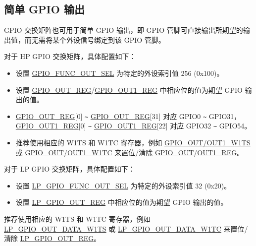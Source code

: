 \documentclass[main\_\_CN.tex]{subfiles}
\begin{document}
\subsection{简单 GPIO 输出}

GPIO 交换矩阵也可用于简单 GPIO 输出，即 GPIO 管脚可直接输出所期望的输出值，而无需将某个外设信号绑定到该 GPIO 管脚。

对于 HP GPIO 交换矩阵，具体配置如下：

\begin{itemize}
    \item 设置 \hyperref[fielddesc:GPIOFUNCNOUTSEL]{GPIO\_FUNC\_OUT\_SEL} 为特定的外设索引值 256 (0x100)。
    \item 设置 \hyperref[regdesc:GPIOOUTREG]{GPIO\_OUT\_REG}/\hyperref[regdesc:GPIOOUT1REG]{GPIO\_OUT1\_REG} 中相应位的值为期望 GPIO 输出的值。
\end{itemize}
\begin{tiplisting}
\vspace{-2em}
\begin{itemize}
\item \hyperref[regdesc:GPIOOUTREG]{GPIO\_OUT\_REG}[0] \verb+~+ \hyperref[regdesc:GPIOOUTREG]{GPIO\_OUT\_REG}[31] 对应 GPIO0 \verb+~+ GPIO31，\hyperref[regdesc:GPIOOUT1REG]{GPIO\_OUT1\_REG}[0] \verb+~+ \hyperref[regdesc:GPIOOUT1REG]{GPIO\_OUT1\_REG}[22] 对应 GPIO32 \verb+~+ GPIO54。
\item 推荐使用相应的 W1TS 和 W1TC 寄存器，例如 \hyperref[fielddesc:GPIOOUTW1TS]{GPIO\_OUT/OUT1\_W1TS} 或 \hyperref[fielddesc:GPIOOUTW1TC]{GPIO\_OUT/OUT1\_W1TC} 来置位/清除 \hyperref[regdesc:GPIOOUTREG]{GPIO\_OUT/OUT1\_REG}。
\end{itemize}
\end{tiplisting}
对于 LP GPIO 交换矩阵，具体配置如下：

\begin{itemize}
    \item 设置 \hyperref[fielddesc:LPGPIOFUNCNOUTSEL]{LP\_GPIO\_FUNC\_OUT\_SEL} 为特定的外设索引值 32 (0x20)。
    \item 设置 \hyperref[regdesc:LPGPIOOUTREG]{LP\_GPIO\_OUT\_REG} 中相应位的值为期望 GPIO 输出的值。
\end{itemize}
\begin{tiplisting}
推荐使用相应的 W1TS 和 W1TC 寄存器，例如 \hyperref[fielddesc:LPGPIOOUTDATAW1TS]{LP\_GPIO\_OUT\_DATA\_W1TS} 或 \hyperref[fielddesc:LPGPIOOUTDATAW1TC]{LP\_GPIO\_OUT\_DATA\_W1TC} 来置位/清除 \hyperref[regdesc:LPGPIOOUTREG]{LP\_GPIO\_OUT\_REG}。
\end{tiplisting}
\end{document}
